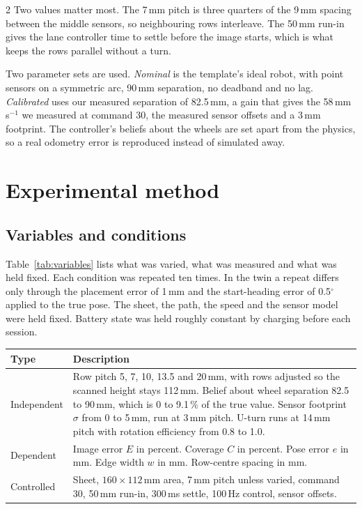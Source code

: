\documentclass[a4paper,10pt]{article}
\begin{document}
\begin{multicols*}{2}
Two values matter most. The 7\,mm pitch is three quarters of the 9\,mm spacing
between the middle sensors, so neighbouring rows interleave. The 50\,mm run-in
gives the lane controller time to settle before the image starts, which is what
keeps the rows parallel without a turn.

Two parameter sets are used. \emph{Nominal} is the template's ideal robot, with
point sensors on a symmetric arc, 90\,mm separation, no deadband and no lag.
\emph{Calibrated} uses our measured separation of 82.5\,mm, a gain that gives the
58\,mm\,s$^{-1}$ we measured at command 30, the measured sensor offsets and a
3\,mm footprint. The controller's beliefs about the wheels are set apart from the
physics, so a real odometry error is reproduced instead of simulated away.

\section{Experimental method}
\subsection*{Variables and conditions}
Table~\ref{tab:variables} lists what was varied, what was measured and what was
held fixed. Each condition was repeated ten times. In the twin a repeat differs
only through the placement error of 1\,mm and the start-heading error of
0.5$^\circ$ applied to the true pose. The sheet, the path, the speed and the
sensor model were held fixed. Battery state was held roughly constant by
charging before each session.

\begin{minipage}{\linewidth}
\label{tab:variables}
\small
\renewcommand{\arraystretch}{1.1}
\setlength{\tabcolsep}{4pt}
\begin{tabularx}{\linewidth}{@{}p{17mm}>{\raggedright\arraybackslash}X@{}}
\toprule
\textbf{Type} & \textbf{Description} \\
\midrule
Independent & Row pitch 5, 7, 10, 13.5 and 20\,mm, with rows adjusted so the
scanned height stays 112\,mm. Belief about wheel separation 82.5 to 90\,mm,
which is 0 to 9.1\,\% of the true value. Sensor footprint $\sigma$ from 0 to
5\,mm, run at 3\,mm pitch. U-turn runs at 14\,mm pitch with rotation efficiency
from 0.8 to 1.0. \\
\addlinespace[3pt]
Dependent & Image error $E$ in percent. Coverage $C$ in percent. Pose error $e$
in mm. Edge width $w$ in mm. Row-centre spacing in mm. \\
\addlinespace[3pt]
Controlled & Sheet, $160\times112$\,mm area, 7\,mm pitch unless varied, command
30, 50\,mm run-in, 300\,ms settle, 100\,Hz control, sensor offsets. \\
\bottomrule
\end{tabularx}
\end{minipage}


\end{multicols*}
\end{document}
